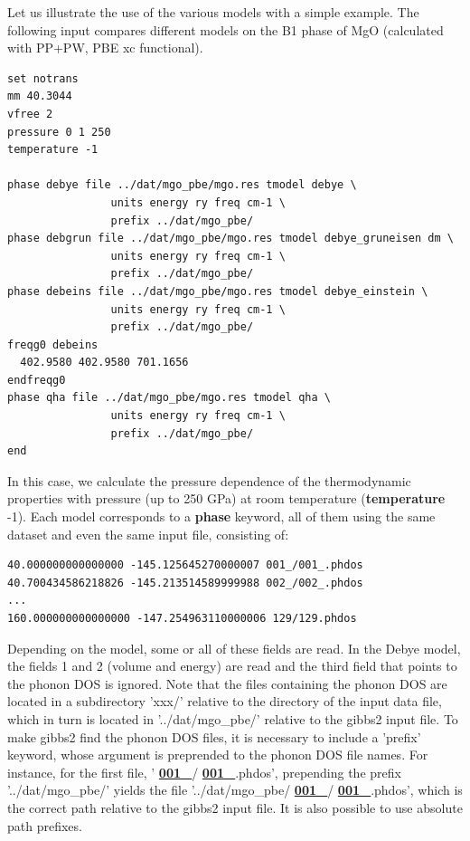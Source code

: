 \documentclass[a4paper]{article}
\begin{document}
Let us illustrate the use of the various models with a simple
example. The following input compares different models on the B1 phase
of MgO (calculated with PP+PW, PBE xc functional).
%
\gibbslist
\begin{lstlisting}
set notrans
mm 40.3044
vfree 2
pressure 0 1 250
temperature -1

phase debye file ../dat/mgo_pbe/mgo.res tmodel debye \
                units energy ry freq cm-1 \
                prefix ../dat/mgo_pbe/
phase debgrun file ../dat/mgo_pbe/mgo.res tmodel debye_gruneisen dm \
                units energy ry freq cm-1 \
                prefix ../dat/mgo_pbe/
phase debeins file ../dat/mgo_pbe/mgo.res tmodel debye_einstein \
                units energy ry freq cm-1 \
                prefix ../dat/mgo_pbe/
freqg0 debeins
  402.9580 402.9580 701.1656
endfreqg0
phase qha file ../dat/mgo_pbe/mgo.res tmodel qha \
                units energy ry freq cm-1 \
                prefix ../dat/mgo_pbe/
end
\end{lstlisting}

In this case, we calculate the pressure dependence of the
thermodynamic properties with pressure (up to 250 GPa) at room
temperature (\textbf{temperature} -1). Each model corresponds to a
\textbf{phase} keyword, all of them using the same dataset and even the
same input file, consisting of:
%
\asciilist
\begin{lstlisting}
40.000000000000000 -145.125645270000007 001_/001_.phdos
40.700434586218826 -145.213514589999988 002_/002_.phdos
...
160.000000000000000 -147.254963110000006 129/129.phdos
\end{lstlisting}

Depending on the model, some or all of these fields are read. In the
Debye model, the fields 1 and 2 (volume and energy) are read and the
third field that points to the phonon DOS is ignored. Note that the
files containing the phonon DOS are located in a subdirectory 'xxx/'
relative to the directory of the input data file, which in turn is
located in '../dat/mgo\_pbe/' relative to the gibbs2 input file. To
make gibbs2 find the phonon DOS files, it is necessary to include a
'prefix' keyword, whose argument is preprended to the phonon DOS file
names. For instance, for the first file, '%
\raisebox{1em}{\hypertarget{id14}{}}\hyperlink{id13}{\textbf{\color{red}001\_}}/%
\raisebox{1em}{\hypertarget{id16}{}}\hyperlink{id15}{\textbf{\color{red}001\_}}.phdos', prepending
the prefix '../dat/mgo\_pbe/' yields the file
'../dat/mgo\_pbe/%
\raisebox{1em}{\hypertarget{id18}{}}\hyperlink{id17}{\textbf{\color{red}001\_}}/%
\raisebox{1em}{\hypertarget{id20}{}}\hyperlink{id19}{\textbf{\color{red}001\_}}.phdos', which is the correct path relative
to the gibbs2 input file. It is also possible to use absolute path
prefixes.
\end{document}
